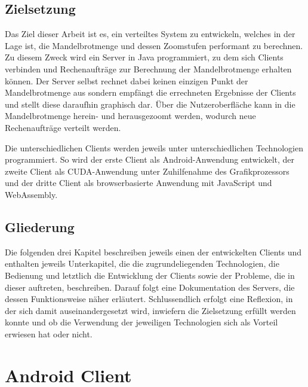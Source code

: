 \documentclass[12pt, onecolumn, notitlepage]{scrartcl}
\begin{document}
\subsection{Zielsetzung}
Das Ziel dieser Arbeit ist es, ein verteiltes System zu entwickeln, welches in der Lage ist, die Mandelbrotmenge und dessen Zoomstufen performant zu berechnen. Zu diesem Zweck wird ein Server in Java programmiert, zu dem sich Clients verbinden und Rechenaufträge zur Berechnung der Mandelbrotmenge erhalten können. Der Server selbst rechnet dabei keinen einzigen Punkt der Mandelbrotmenge aus sondern empfängt die errechneten Ergebnisse der Clients und stellt diese daraufhin graphisch dar. Über die Nutzeroberfläche kann in die Mandelbrotmenge herein- und herausgezoomt werden, wodurch neue Rechenaufträge verteilt werden.  \par
Die unterschiedlichen Clients werden jeweils unter unterschiedlichen Technologien programmiert. So wird der erste Client als Android-Anwendung entwickelt, der zweite Client als CUDA-Anwendung unter Zuhilfenahme des Grafikprozessors und der dritte Client als browserbasierte Anwendung mit JavaScript und WebAssembly. 
\subsection{Gliederung}
Die folgenden drei Kapitel beschreiben jeweils einen der entwickelten Clients und enthalten jeweils Unterkapitel, die die zugrundeliegenden Technologien, die Bedienung und letztlich die Entwicklung der Clients sowie der Probleme, die in dieser auftreten, beschreiben. Darauf folgt eine Dokumentation des Servers, die dessen Funktionsweise näher erläutert. Schlussendlich erfolgt eine Reflexion, in der sich damit auseinandergesetzt wird, inwiefern die Zielsetzung erfüllt werden konnte und ob die Verwendung der jeweiligen Technologien sich als Vorteil erwiesen hat oder nicht.


\section{Android Client}
\end{document}
